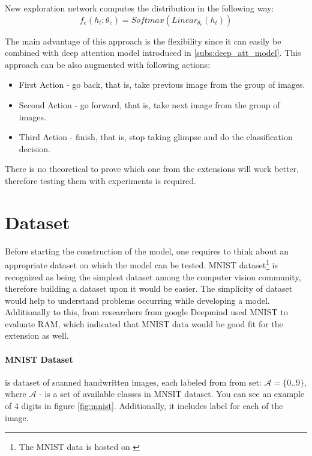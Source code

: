 New exploration network computes the distribution in the following way:
\begin{equation}
	f_e(h_t; \theta_e) = Softmax(Linear_{\theta_e}(h_t))
\end{equation}

The main advantage of this approach is the flexibility since it can easily be combined
with deep attention model introduced in \autoref{subs:deep_att_model}. This
approach can be also augmented with following actions:
\begin{itemize}
	\item First Action - go back, that is, take previous image from the group of images.
	\item Second Action - go forward, that is, take next image from the group of images.
	\item Third Action - finish, that is, stop taking glimpse and do the classification decision.
\end{itemize}

There is no theoretical to prove which one from the extensions will work better,
therefore testing them with experiments is required.
\section{Dataset}
\label{sec:analysis_dataset}

Before starting the construction of the model, one requires to think about an appropriate
dataset on which the model can be tested.
MNIST dataset\footnote{The MNIST data is hosted on \cite{LeCun2010}} is recognized
as being the simplest dataset among the computer vision
community, therefore building a dataset upon it would be easier. The simplicity of dataset
would help to understand problems occurring while developing a model.
Additionally to this, from researchers from google
Deepmind used MNIST to evaluate RAM, which indicated that MNIST data would
be good fit for the extension as well. \cite{DBLP:journals/corr/MnihHGK14}


\paragraph{MNIST Dataset} is dataset of scanned handwritten images, each labeled
from from set: $\mathcal{A} = \{0 .. 9\}$, where $\mathcal{A}$ - is a set of available
classes in MNSIT dataset. You can see an example of 4 digits in figure \ref{fig:mnist}.
Additionally, it includes label for each of the image.

